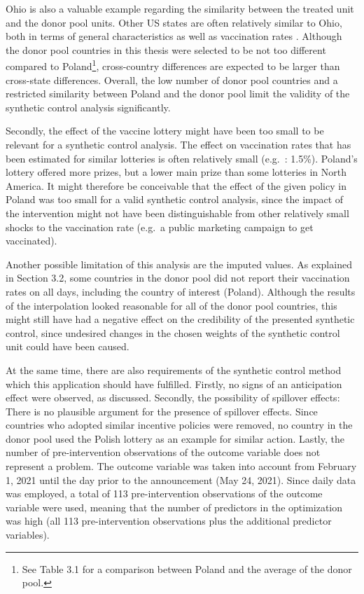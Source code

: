 \documentclass{scrbook}
\begin{document}
Ohio is also a valuable example regarding the similarity between the
treated unit and the donor pool units. Other US states are often
relatively similar to Ohio, both in terms of general characteristics as
well as vaccination rates \parencite{mathieu_global_2021}. Although the
donor pool countries in this thesis were selected to be not too
different compared to
Poland\footnote{See Table 3.1 for a comparison between Poland and the average of the donor pool.},
cross-country differences are expected to be larger than cross-state
differences. Overall, the low number of donor pool countries and a
restricted similarity between Poland and the donor pool limit the
validity of the synthetic control analysis significantly.

Secondly, the effect of the vaccine lottery might have been too small to
be relevant for a synthetic control analysis. The effect on vaccination
rates that has been estimated for similar lotteries is often relatively
small (e.g.~\textcite{barber_conditional_2022}: 1.5\%). Poland's lottery
offered more prizes, but a lower main prize than some lotteries in North
America. It might therefore be conceivable that the effect of the given
policy in Poland was too small for a valid synthetic control analysis,
since the impact of the intervention might not have been distinguishable
from other relatively small shocks to the vaccination rate (e.g.~a
public marketing campaign to get vaccinated).

Another possible limitation of this analysis are the imputed values. As
explained in Section 3.2, some countries in the donor pool did not
report their vaccination rates on all days, including the country of
interest (Poland). Although the results of the interpolation looked
reasonable for all of the donor pool countries, this might still have
had a negative effect on the credibility of the presented synthetic
control, since undesired changes in the chosen weights of the synthetic
control unit could have been caused.

At the same time, there are also requirements of the synthetic control
method which this application should have fulfilled. Firstly, no signs
of an anticipation effect were observed, as discussed. Secondly, the
possibility of spillover effects: There is no plausible argument for the
presence of spillover effects. Since countries who adopted similar
incentive policies were removed, no country in the donor pool used the
Polish lottery as an example for similar action. Lastly, the number of
pre-intervention observations of the outcome variable does not represent
a problem. The outcome variable was taken into account from February 1,
2021 until the day prior to the announcement (May 24, 2021). Since daily
data was employed, a total of 113 pre-intervention observations of the
outcome variable were used, meaning that the number of predictors in the
optimization was high (all 113 pre-intervention observations plus the
additional predictor variables).
\end{document}
